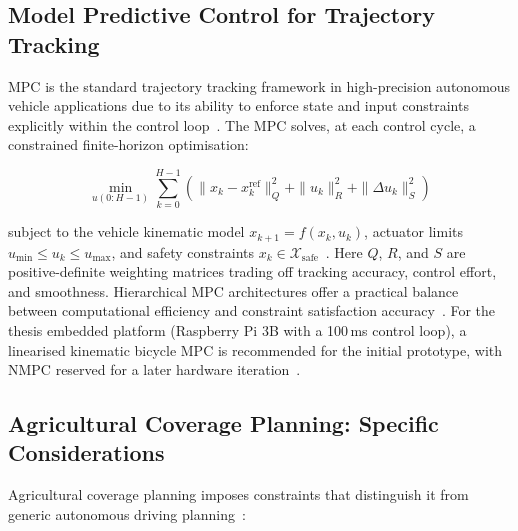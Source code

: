 \documentclass[12pt, a4paper]{article}
\begin{document}
\subsection{Model Predictive Control for Trajectory Tracking}

MPC is the standard trajectory tracking framework in high-precision autonomous vehicle
applications due to its ability to enforce state and input constraints explicitly within
the control loop~\cite{ref118, ref121, ref138}. The MPC solves, at each control cycle, a
constrained finite-horizon optimisation:

\begin{equation}
  \min_{u(0:H-1)} \sum_{k=0}^{H-1} \left( \|x_k - x_k^{\mathrm{ref}}\|^2_Q + \|u_k\|^2_R + \|\Delta u_k\|^2_S \right)
  \label{eq:mpc}
\end{equation}

subject to the vehicle kinematic model $x_{k+1} = f(x_k, u_k)$, actuator limits
$u_{\min} \leq u_k \leq u_{\max}$, and safety constraints
$x_k \in \mathcal{X}_{\mathrm{safe}}$~\cite{ref3}. Here $Q$, $R$, and $S$ are
positive-definite weighting matrices trading off tracking accuracy, control effort, and
smoothness. Hierarchical MPC architectures offer a practical balance between computational
efficiency and constraint satisfaction accuracy~\cite{ref103, ref105}. For the thesis
embedded platform (Raspberry Pi 3B with a 100\,ms control loop), a linearised kinematic
bicycle MPC is recommended for the initial prototype, with NMPC reserved for a later
hardware iteration~\cite{ref1, ref2}.

\subsection{Agricultural Coverage Planning: Specific Considerations}

Agricultural coverage planning imposes constraints that distinguish it from generic
autonomous driving planning~\cite{ref2, ref103, ref105, ref138}:
\end{document}
